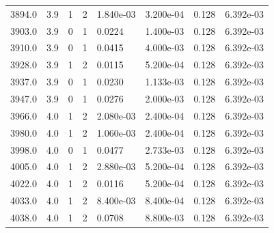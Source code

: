 \documentclass[preview]{standalone}
\begin{document}
{{{{{\begin{tabular}{L{1.2cm}C{1.2cm} C{0.3cm}C{0.5cm} C{1.4cm}C{1.4cm} C{1.4cm}C{1.4cm}}
  3894.0  &   3.9  & 1     &  2 &  1.840e-03  & 3.200e-04  & 0.128 &  6.392e-03   \\ 
  3903.0  &   3.9  & 0     &  1 &  0.0224  & 1.400e-03  & 0.128 &  6.392e-03   \\ 
  3910.0  &   3.9  & 0     &  1 &  0.0415  & 4.000e-03  & 0.128 &  6.392e-03   \\ 
  3928.0  &   3.9  & 1     &  2 &  0.0115  & 5.200e-04  & 0.128 &  6.392e-03   \\ 
  3937.0  &   3.9  & 0     &  1 &  0.0230  & 1.133e-03  & 0.128 &  6.392e-03   \\ 
  3947.0  &   3.9  & 0     &  1 &  0.0276  & 2.000e-03  & 0.128 &  6.392e-03   \\ 
  3966.0  &   4.0  & 1     &  2 &  2.080e-03  & 2.400e-04  & 0.128 &  6.392e-03   \\ 
  3980.0  &   4.0  & 1     &  2 &  1.060e-03  & 2.400e-04  & 0.128 &  6.392e-03   \\ 
  3998.0  &   4.0  & 0     &  1 &  0.0477  & 2.733e-03  & 0.128 &  6.392e-03   \\ 
  4005.0  &   4.0  & 1     &  2 &  2.880e-03  & 5.200e-04  & 0.128 &  6.392e-03   \\ 
  4022.0  &   4.0  & 1     &  2 &  0.0116  & 5.200e-04  & 0.128 &  6.392e-03   \\ 
  4033.0  &   4.0  & 1     &  2 &  8.400e-03  & 8.400e-04  & 0.128 &  6.392e-03   \\ 
  4038.0  &   4.0  & 1     &  2 &  0.0708  & 8.800e-03  & 0.128 &  6.392e-03   \\ 
\hline 
\end{tabular} 

}}}}}
\end{document}

